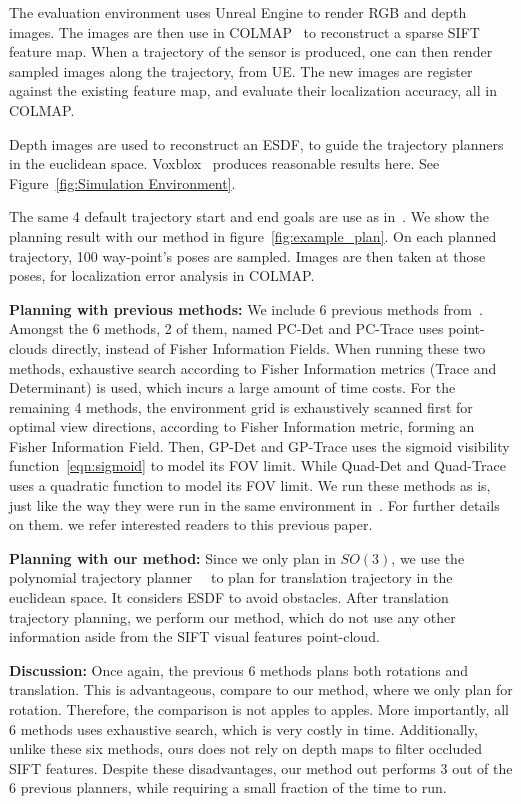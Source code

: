 \documentclass[letterpaper, 10 pt, conference]{ieeeconf}  %
\begin{document}
  The evaluation environment uses Unreal Engine to render RGB and depth images. The images are then use in COLMAP~\cite{Schonberger_2016_CVPR} to reconstruct a sparse SIFT feature map. When a trajectory of the sensor is produced, one can then render sampled images along the trajectory, from UE. The new images are register against the existing feature map, and evaluate their localization accuracy, all in COLMAP.


 Depth images are used to reconstruct an ESDF, to guide the trajectory planners in the euclidean space. Voxblox~\cite{oleynikova2017voxblox} produces reasonable results here. See Figure~\ref{fig:Simulation Environment}.

The same 4 default trajectory start and end goals are use as in~\cite{zhang2020fisher}. We show the planning result with our method in figure~\ref{fig:example_plan}. On each planned trajectory, 100 way-point's poses are sampled. Images are then taken at those poses, for localization error analysis in COLMAP.

 \noindent \textbf{Planning with previous methods:}
 \label{planning_with_prev}
We include 6 previous methods
from~\cite{zhang2020fisher}. Amongst the 6 methods, 2 of them, named PC-Det and PC-Trace uses point-clouds directly, instead of Fisher Information Fields. When running these two methods, exhaustive search according to Fisher Information metrics (Trace and Determinant) is used, which incurs a large amount of time costs. For the remaining 4 methods, the environment grid is exhaustively scanned first for optimal view directions, according to Fisher Information metric, forming an Fisher Information Field.  Then, GP-Det and GP-Trace uses the sigmoid visibility function~\ref{eqn:sigmoid} to model its FOV limit. While Quad-Det and Quad-Trace uses a quadratic function to model its FOV limit. We run these methods as is, just like the way they were run in the same environment in~\cite{zhang2020fisher}. For further details on them. we refer interested readers to this previous paper.

\noindent \textbf{Planning with our method:}
Since we only plan in $SO(3)$, we use the polynomial trajectory planner~\cite{richter2016polynomial}~\cite{burri2015real-time} to plan for translation trajectory in the euclidean space. It considers ESDF to avoid obstacles. After translation trajectory planning, we perform our method, which do not use any other information aside from the SIFT visual features point-cloud.

\noindent \textbf{Discussion:}
Once again, the previous 6 methods plans both rotations and translation. This is advantageous, compare to our method, where we only plan for rotation. Therefore, the comparison is not apples to apples. More importantly, all 6 methods uses exhaustive search, which is very costly in time. Additionally, unlike these six methods, ours does not rely on depth maps to filter occluded SIFT features.
Despite these disadvantages, our method out performs 3 out of the 6 previous planners, while requiring a small fraction of the time to run.
\end{document}
